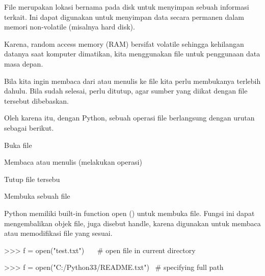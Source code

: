 \vspace{12pt}
\vspace{12pt}
\vspace{14pt}
\noindent 
File merupakan lokasi bernama pada disk untuk menyimpan sebuah informasi terkait. Ini dapat digunakan untuk menyimpan data secara permanen dalam memori non-volatile (misalnya hard disk). \par
\noindent 
\vspace{12pt}
\noindent 
Karena, random access memory (RAM) bersifat volatile sehingga kehilangan datanya saat komputer dimatikan, kita menggunakan file untuk penggunaan data masa depan. \par
\noindent 
\vspace{12pt}
\noindent 
Bila kita ingin membaca dari atau menulis ke file kita perlu membukanya terlebih dahulu. Bila sudah selesai, perlu ditutup, agar sumber yang diikat dengan file tersebut dibebaskan. \par
\noindent 
\vspace{12pt}
\noindent 
Oleh karena itu, dengan Python, sebuah operasi file berlangsung dengan urutan sebagai berikut. \par
\vspace{12pt}
\noindent 
\begin{myEnumerate}
\item Buka file \par
\noindent 
\item Membaca atau menulis (melakukan operasi) \par
\noindent 
\item Tutup file tersebu\end{myEnumerate}
 \par
\vspace{12pt}
\vspace{12pt}
\vspace{12pt}
\noindent 
Membuka sebuah file \par
\noindent 
Python memiliki built-in function open () untuk membuka file. Fungsi ini dapat mengembalikan objek file, juga disebut handle, karena digunakan untuk membaca atau memodifikasi file yang sesuai. \par
\vspace{12pt}
\noindent 
>>> f = open("test.txt")~~~  $  \#  $ open file in current directory \par
\noindent 
>>> f = open("C:/Python33/README.txt")~  $  \#  $ specifying full path \par
\vspace{12pt}
